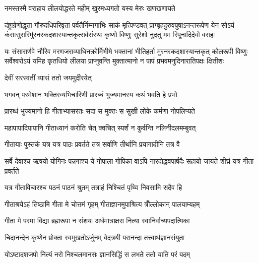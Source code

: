 

\twolineshloka
{नमस्तस्मै वराहाय लीलयोद्धरते महीम्}
{खुरमध्यगतो यस्य मेरुः खणखणायते}

\fourlineindentedshloka
{दंष्ट्राग्रेणोद्धृता गौरुदधिपरिवृता पर्वतैर्निम्नगाभिः}
{साकं मृत्पिण्डवत् प्राग्बृहदुरुवपुषाऽनन्तरूपेण येन}
{सोऽयं कंसासुरारिर्मुरनरकदशास्यान्तकृत्सर्वसंस्थः}
{कृष्णो विष्णुः सुरेशो नुदतु मम रिपूनादिदेवो वराहः}

\fourlineindentedshloka
{यः संसारार्णवे नौरिव मरणजराव्याधिनक्रोर्मिभीमे}
{भक्तानां भीतिहर्ता मुरनरकदशास्यान्तकृत् कोलरूपी}
{विष्णुः सर्वेश्वरोऽयं यमिह कृतधियो लीलया प्राप्नुवन्ति}
{मुक्तात्मानो न पापं प्रभवमनुदिनारातिपक्षः क्षितीशः}

\closesub

{देवीं सरस्वतीं व्यासं ततो जयमुदीरयेत्}

\resetShloka{}

\twolineshloka
{भगवन् परमेशान भक्तिरव्यभिचारिणी}
{प्रारब्धं भुज्यमानस्य कथं भवति हे प्रभो}%

\twolineshloka
{प्रारब्धं भुज्यमानो हि गीताभ्यासरतः सदा}
{स मुक्तः स सुखी लोके कर्मणा नोपलिप्यते}%

\twolineshloka
{महापापादिपापानि गीताध्यानं करोति चेत्}
{क्वचित् स्पर्शं न कुर्वन्ति नलिनीदलमम्बुवत्}%

\twolineshloka
{गीतायाः पुस्तकं यत्र यत्र पाठः प्रवर्तते}
{तत्र सर्वाणि तीर्थानि प्रयागादीनि तत्र वै}%

\threelineshloka
{सर्वे देवाश्च ऋषयो योगिनः पन्नगाश्च ये}
{गोपाला गोपिका वाऽपि नारदोद्धवपार्षदैः}
{सहायो जायते शीघ्रं यत्र गीता प्रवर्तते}%

\twolineshloka
{यत्र गीताविचारश्च पठनं पाठनं श्रुतम्}
{तत्राहं निश्चितं पृथ्वि निवसामि सदैव हि}%

\twolineshloka
{गीताश्रयेऽहं तिष्ठामि गीता मे चोत्तमं गृहम्}
{गीताज्ञानमुपाश्रित्य त्रीँल्लोकान् पालयाम्यहम्}%

\twolineshloka
{गीता मे परमा विद्या ब्रह्मरूपा न संशयः}
{अर्धमात्राक्षरा नित्या स्वानिर्वाच्यपदात्मिका}%

\twolineshloka
{चिदानन्देन कृष्णेन प्रोक्ता स्वमुखतोऽर्जुनम्}
{वेदत्रयी परानन्दा तत्त्वार्थज्ञानसंयुता}%

\twolineshloka
{योऽष्टादशजपो नित्यं नरो निश्चलमानसः}
{ज्ञानसिद्धिं स लभते ततो याति परं पदम्}%

